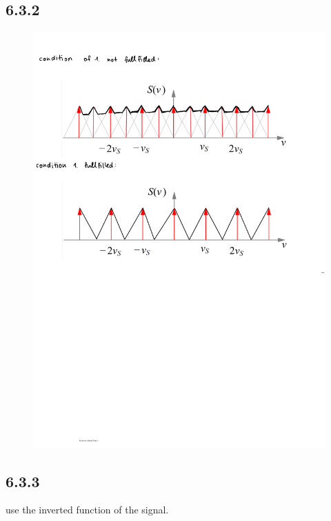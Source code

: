 \documentclass[a4paper]{article}
\begin{document}
\newpage
\subsection*{6.3.2}
\begin{figure}[!ht]
	\centering
	\includegraphics[width=0.88\linewidth]{6_3_2.pdf}
	\label{fig:delaunay}
\end{figure}

\subsection*{6.3.3}
use the inverted function of the signal.
\end{document}
